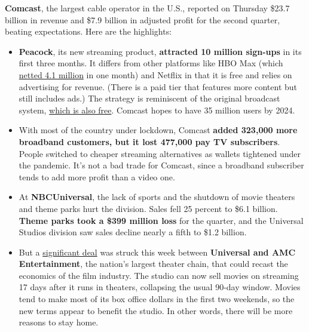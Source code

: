 \textbf{Comcast}, the largest cable operator in the U.S., reported on
Thursday \$23.7 billion in revenue and \$7.9 billion in adjusted profit
for the second quarter, beating expectations. Here are the highlights:

\begin{itemize}
\tightlist
\item
  \textbf{Peacock}, its new streaming product, \textbf{attracted 10
  million sign-ups} in its first three months. It differs from other
  platforms like HBO Max (which
  \href{https://www.nytimes3xbfgragh.onion/2020/07/23/business/media/att-hbo-max.html}{netted
  4.1 million} in one month) and Netflix in that it is free and relies
  on advertising for revenue. (There is a paid tier that features more
  content but still includes ads.) The strategy is reminiscent of the
  original broadcast system,
  \href{https://www.nytimes3xbfgragh.onion/2019/01/31/business/locast-streaming-free-network-tv.html}{which
  is also free}. Comcast hopes to have 35 million users by 2024.
\end{itemize}

\begin{itemize}
\tightlist
\item
  With most of the country under lockdown, Comcast \textbf{added 323,000
  more broadband customers, but it lost 477,000 pay TV subscribers}.
  People switched to cheaper streaming alternatives as wallets tightened
  under the pandemic. It's not a bad trade for Comcast, since a
  broadband subscriber tends to add more profit than a video one.
\end{itemize}

\begin{itemize}
\tightlist
\item
  At \textbf{NBCUniversal}, the lack of sports and the shutdown of movie
  theaters and theme parks hurt the division. Sales fell 25 percent to
  \$6.1 billion. \textbf{Theme parks took a \$399 million loss} for the
  quarter, and the Universal Studios division saw sales decline nearly a
  fifth to \$1.2 billion.
\end{itemize}

\begin{itemize}
\tightlist
\item
  But a
  \href{https://www.nytimes3xbfgragh.onion/2020/07/28/business/media/universal-amc-movies-at-home.html}{significant
  deal} was struck this week between \textbf{Universal and AMC
  Entertainment}, the nation's largest theater chain, that could recast
  the economics of the film industry. The studio can now sell movies on
  streaming 17 days after it runs in theaters, collapsing the usual
  90-day window. Movies tend to make most of its box office dollars in
  the first two weekends, so the new terms appear to benefit the studio.
  In other words, there will be more reasons to stay home.
\end{itemize}

